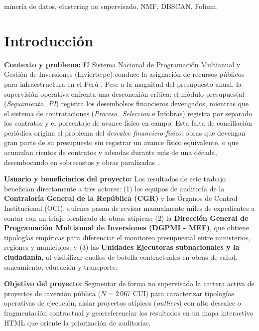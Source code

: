 \documentclass[conference]{IEEEtran}
\begin{document}
\begin{IEEEkeywords}
miner\'ia de datos, clustering no supervisado, NMF, DBSCAN, Folium.
\end{IEEEkeywords}

\section{Introducci\'on}

\textbf{Contexto y problema:} El Sistema Nacional de Programaci\'on Multianual y Gesti\'on de Inversiones (Invierte.pe) conduce la asignaci\'on de recursos p\'ublicos para infraestructura en el Per\'u \cite{mef2024}. Pese a la magnitud del presupuesto anual, la supervisi\'on operativa enfrenta una desconexi\'on cr\'itica: el m\'odulo presupuestal (\textit{Seguimiento\_PI}) registra los desembolsos financieros devengados, mientras que el sistema de contrataciones (\textit{Proceso\_Seleccion} e Infobras) registra por separado los contratos y el porcentaje de avance f\'isico en campo. Esta falta de conciliaci\'on peri\'odica origina el problema del \textit{descalce financiero-f\'isico}: obras que devengan gran parte de su presupuesto sin registrar un avance f\'isico equivalente, o que acumulan cientos de contratos y adendas durante m\'as de una d\'ecada, desembocando en sobrecostos y obras paralizadas \cite{cgr2024}.

\textbf{Usuario y beneficiarios del proyecto:} Los resultados de este trabajo benefician directamente a tres actores: (1) los equipos de auditor\'ia de la \textbf{Contralor\'ia General de la Rep\'ublica (CGR)} y los \'Organos de Control Institucional (OCI), quienes pasan de revisar manualmente miles de expedientes a contar con un triaje focalizado de obras at\'ipicas; (2) la \textbf{Direcci\'on General de Programaci\'on Multianual de Inversiones (DGPMI - MEF)}, que obtiene tipolog\'ias emp\'iricas para diferenciar el monitoreo presupuestal entre ministerios, regiones y municipios; y (3) las \textbf{Unidades Ejecutoras subnacionales y la ciudadan\'ia}, al visibilizar cuellos de botella contractuales en obras de salud, saneamiento, educaci\'on y transporte.

\textbf{Objetivo del proyecto:} Segmentar de forma no supervisada la cartera activa de proyectos de inversi\'on p\'ublica ($N = 2\,067$ CUI) para caracterizar tipolog\'ias operativas de ejecuci\'on, aislar proyectos at\'ipicos (\textit{outliers}) con alto descalce o fragmentaci\'on contractual y georreferenciar los resultados en un mapa interactivo HTML que oriente la priorizaci\'on de auditor\'ias.
\end{document}
